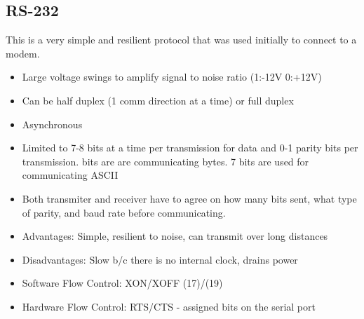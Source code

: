 \documentclass{hw}
\begin{document}
\subsection{RS-232}
This is a very simple and resilient protocol that was used initially to connect
to a modem.
\begin{itemize}
  \item Large voltage swings to amplify signal to noise ratio (1:-12V 0:+12V)
  \item Can be half duplex (1 comm direction at a time) or full duplex
  \item Asynchronous 
  \item Limited to 7-8 bits at a time per transmission for data and 0-1 parity 
    bits per transmission.
     bits are are communicating bytes. 7 bits are used for communicating
    ASCII
  \item Both transmiter and receiver have to agree on how many bits sent, what
    type of parity, and baud rate before communicating.
  \item Advantages: Simple, resilient to noise, can transmit over long distances
  \item Disadvantages: Slow b/c there is no internal clock, drains power
  \item Software Flow Control: XON/XOFF (17)/(19)
  \item Hardware Flow Control: RTS/CTS - assigned bits on the serial port
\end{itemize}
\end{document}
